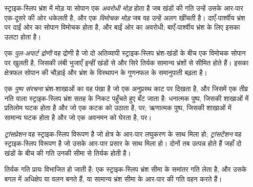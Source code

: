 \begin{definition}[अवरोधी मोड़, विमोचक मोड़]\label{def:b3:extension-strike-slip:bends}
स्ट्राइक-स्लिप भ्रंश में मोड़ या सोपान एक \emph{अवरोधी
मोड़} होता है जब खंडों की गति उन्हें उसके आर-पार एक-दूसरे की ओर धकेलती है,
और एक \emph{विमोचक मोड़} जब वह उन्हें अलग खींचती है। दाएँ-पार्श्वीय भ्रंश पर
दाईं ओर का सोपान विमोचक होता है,
और बाईं ओर का अवरोधी; बाएँ-पार्श्वीय भ्रंश के लिए इसका उलटा होता है।
\end{definition}

\begin{definition}[पुल-अपार्ट द्रोणी]\label{def:b3:extension-strike-slip:pull-apart}
एक \emph{पुल-अपार्ट द्रोणी} वह द्रोणी है जो दो अतिव्यापी स्ट्राइक-स्लिप
भ्रंश-खंडों के बीच एक विमोचक सोपान पर खुलती है, जिसकी लंबी भुजाएँ इन्हीं खंडों से
और सिरे तिर्यक सामान्य भ्रंशों से सीमित होते हैं।
इसका क्षेत्रफल सोपान की चौड़ाई और भ्रंश के विस्थापन के गुणनफल के समानुपाती बढ़ता है।
\end{definition}

\begin{definition}[पुष्प संरचना]\label{def:b3:extension-strike-slip:flower}
एक \emph{पुष्प संरचना} भ्रंश-शाखाओं का वह पंखा है जो एक अनुप्रस्थ
काट पर दिखता है, और जिसमें एक तीव्र नति वाला स्ट्राइक-स्लिप भ्रंश सतह के निकट पहुँचते हुए बँट जाता है:
धनात्मक पुष्प, जिसकी शाखाओं में प्रतिलोम घटक होता है और जो एक कटक को उठाता है,
 पर; ऋणात्मक पुष्प, जिसकी शाखाओं में सामान्य घटक होता है
और जो एक अवनमन को घेरता है,  पर।
\end{definition}

\begin{definition}[ट्रांसप्रेशन, ट्रांसटेंशन]\label{def:b3:extension-strike-slip:transpression}
\emph{ट्रांसप्रेशन} वह स्ट्राइक-स्लिप विरूपण है जो क्षेत्र के आर-पार
लघुकरण के साथ मिला हो; \emph{ट्रांसटेंशन} वह स्ट्राइक-स्लिप विरूपण है जो
उसके आर-पार प्रसार के साथ मिला हो। दोनों तब उत्पन्न होते हैं जहाँ दो खंडों के बीच की गति
उनकी सीमा से तिर्यक होती है।
\end{definition}

तिर्यक गति प्रायः विभाजित हो जाती है: एक स्ट्राइक-स्लिप भ्रंश सीमा के समांतर
गति लेता है, और उसके बगल में अधिक्षेप या वलन बनते हैं, या सामान्य भ्रंश
सीमा के आर-पार की गति वहन करते हैं।

